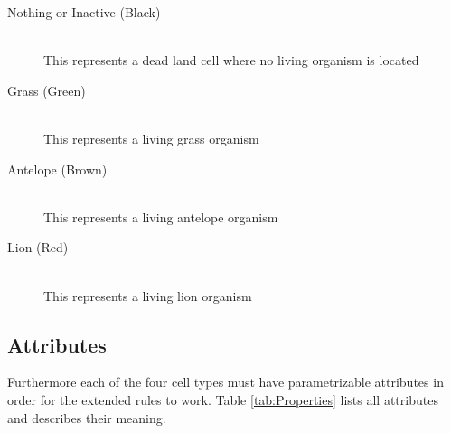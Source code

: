 \documentclass[11pt]{article}
\begin{document}
\begin{description}
  \item[Nothing or Inactive (Black)] \hfill \\
	This represents a dead land cell where no living organism is located
  \item[Grass (Green)] \hfill \\
	This represents a living grass organism
  \item[Antelope (Brown)]  \hfill \\
	This represents a living antelope organism
  \item[Lion (Red)] 
   \hfill \\This represents a living lion organism
\end{description}

\subsection{Attributes}
Furthermore each of the four cell types must have parametrizable attributes in order for the extended rules to work. 
Table \ref{tab:Properties} lists all attributes and describes their meaning.
\end{document}
